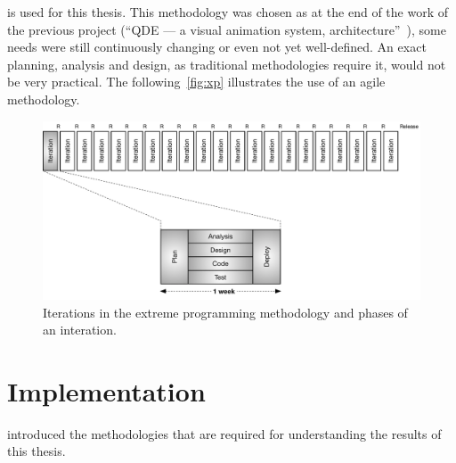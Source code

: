 \documentclass[%
    a4paper,    %
    justified,  %
    nobib,      %
    openany     %
]{tufte-book}
\makeatletter
\renewcommand{\label}[1]{\@tufte@label{##1}}%
\makeatother
\begin{document}
 is used for this thesis.
This methodology was chosen as at the end of the work of the previous project
(\enquote{QDE --- a visual animation system,
architecture}~\cite{osterwalder-qde-2016}), some needs were still continuously
changing or even not yet well-defined. An exact planning, analysis and design,
as traditional methodologies require it, would not be very practical. The
following~\autoref{fig:xp} illustrates the use of an agile methodology.

\begin{figure}[!htbp]
  \includegraphics[width=0.95\linewidth]{images/xp}
  \caption{Iterations in the extreme programming methodology and phases of an
    interation.~\cite[p. 18]{shore-aad-2007}}
\label{fig:xp}
\end{figure}

\chapter{Implementation}
\label{chap:implementation}


 introduced the methodologies that are required
for understanding the results of this thesis.
\end{document}
